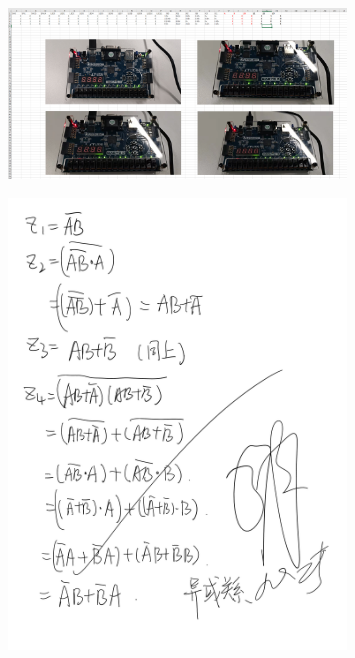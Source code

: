 \documentclass[UTF8]{ctexart}
\numberwithin{figure}{subsection}
\numberwithin{table}{subsection}
\numberwithin{equation}{subsection}
\begin{document}
\begin{figure}[H]
    \begin{center}
        \includegraphics[width=0.8\textwidth]{excel.png}
    \end{center}
\end{figure}

\begin{figure}[H]
    \begin{center}
        \includegraphics[width=0.8\textwidth]{sign.pdf}
    \end{center}
\end{figure}
\end{document}
